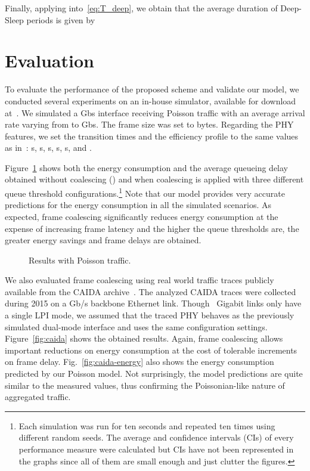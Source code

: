 \documentclass[journal,10pt,letterpaper]{IEEEtran}
\begin{document}
Finally, applying  into~\eqref{eq:T_deep}, we obtain that
the average duration of Deep-Sleep periods is given by


\section{Evaluation}
\label{sec:evaluation}

To evaluate the performance of the proposed scheme and validate our
model, we conducted several experiments on an in-house simulator,
available for download at~\cite{herreria15:dualmode_eee_simulator}. We
simulated a Gbs interface receiving Poisson traffic with an
average arrival rate varying from  to Gbs. The frame size
was set to bytes. Regarding the PHY features, we set the
transition times and the efficiency profile to the same values as
in~\cite{mostowfi15:dual_mode_eee}: s,
s, s,
s, s,
 and .

Figure~\ref{fig:poisson} shows both the energy consumption and the
average queueing delay obtained without coalescing () and when coalescing is applied with three
different queue threshold configurations.\footnote{Each simulation was
  run for ten seconds and repeated ten times using different random
  seeds. The average and  confidence intervals (CIs) of every
  performance measure were calculated but CIs have not been
  represented in the graphs since all of them are small enough and
  just clutter the figures.}  Note that our model provides very
accurate predictions for the energy consumption in all the simulated
scenarios. As expected, frame coalescing significantly reduces energy
consumption at the expense of increasing frame latency and the higher
the queue thresholds are, the greater energy savings and frame delays
are obtained.

\begin{figure}[t]
  \centering
  \caption{Results with Poisson traffic.}
  \label{fig:poisson}
\end{figure}

We also evaluated frame coalescing using real world traffic traces
publicly available from the CAIDA archive~\cite{caida15}. The analyzed
CAIDA traces were collected during 2015 on a Gb/s backbone
Ethernet link. Though ~Gigabit links only have a single LPI mode,
we assumed that the traced PHY behaves as the previously simulated
dual-mode interface and uses the same configuration
settings. Figure~\ref{fig:caida} shows the obtained results. Again,
frame coalescing allows important reductions on energy consumption at
the cost of tolerable increments on frame
delay. Fig.~\ref{fig:caida-energy} also shows the energy consumption
predicted by our Poisson model. Not surprisingly, the model
predictions are quite similar to the measured values, thus confirming
the Poissonian-like nature of aggregated traffic.
\end{document}
